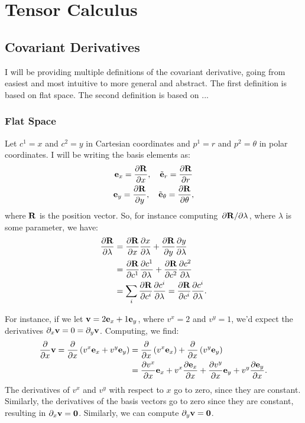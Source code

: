\section{Tensor Calculus}

\subsection{Covariant Derivatives}

I will be providing multiple definitions of the covariant derivative, going from easiest and most intuitive to more general and abstract. The first definition is based on flat space. The second definition is based on ...

\subsubsection{Flat Space}

Let $c^1 = x$ and $c^2 = y$ in Cartesian coordinates and $p^1 = r$ and $p^2 = \theta$ in polar coordinates. I will be writing the basis elements as:
\begin{gather*}
  \mathbf{e}_x = \pdv{\mathbf{R}}{x}, \quad \tilde{\mathbf{e}}_r = \pdv{\mathbf{R}}{r} \\
  \mathbf{e}_y = \pdv{\mathbf{R}}{y}, \quad \tilde{\mathbf{e}}_\theta = \pdv{\mathbf{R}}{\theta}
,\end{gather*}
where $\mathbf{R}$ is the position vector. So, for instance computing $\pdv{\mathbf{R}}/{\lambda}$, where $\lambda$ is some parameter, we have:
\begin{align*}
  \pdv{\mathbf{R}}{\lambda} &= \pdv{\mathbf{R}}{x}\pdv{x}{\lambda} + \pdv{\mathbf{R}}{y}\pdv{y}{\lambda} \\
                      &= \pdv{\mathbf{R}}{c^1}\pdv{c^1}{\lambda} + \pdv{\mathbf{R}}{c^2}\pdv{c^2}{\lambda} \\
                      &= \sum_{i} \pdv{\mathbf{R}}{c^i}\pdv{c^i}{\lambda} = \pdv{\mathbf{R}}{c^i}\pdv{c^i}{\lambda}
.\end{align*}

\begin{example}
  For instance, if we let $\mathbf{v} = 2\mathbf{e}_x + 1\mathbf{e}_y$, where $v^x = 2$ and $v^y = 1$, we'd expect the derivatives $\pd{x}\v = 0 = \pd{y}\v$. Computing, we find:
  \begin{align*}
    \pdv{}{x} \mathbf{v} = \pdv{}{x} \left(v^x\mathbf{e}_x + v^y\mathbf{e}_y\right) &= \pdv{}{x} \left(v^x\mathbf{e}_x\right) + \pdv{}{x} \left(v^y\mathbf{e}_y\right) \\
                                                            &= \pdv{v^x}{x}\mathbf{e}_x + v^x\pdv{\mathbf{e}_x}{x} + \pdv{v^y}{x}\mathbf{e}_y + v^y\pdv{\mathbf{e}_y}{x}
  .\end{align*}
  The derivatives of $v^x$ and $v^y$ with respect to $x$ go to zero, since they are constant. Similarly, the derivatives of the basis vectors go to zero since they are constant, resulting in $\pd{x}\v = \zero$. Similarly, we can compute $\pd{y}\v = \zero$.
\end{example}

